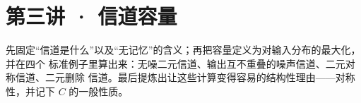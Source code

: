\clearpage
\section*{第三讲 · 信道容量}
{}
\begin{strand}
先固定“信道是什么”以及“无记忆”的含义；再把容量定义为对输入分布的最大化，并在四个
标准例子里算出来：无噪二元信道、输出互不重叠的噪声信道、二元对称信道、二元删除
信道。最后提炼出让这些计算变得容易的结构性理由——对称性，并记下 $C$ 的一般性质。
\end{strand}



\clearpage


\clearpage


\clearpage


\clearpage


\clearpage



